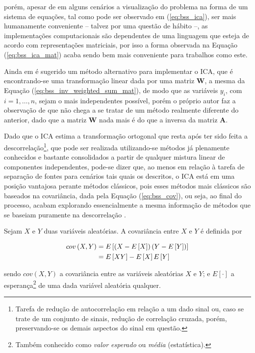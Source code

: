 \noindent porém, apesar de em alguns cenários a visualização do problema na forma de um sistema de equações, tal como pode ser observado em (\ref{eq:bss_ica}), ser mais humanamente conveniente -- talvez por uma questão de hábito --, as implementações computacionais são dependentes de uma linguagem que esteja de acordo com representações matriciais, por isso a forma observada na Equação (\ref{eq:bss_ica_mat}) acaba sendo bem mais conveniente para trabalhos como este.

Ainda em \citep{hyvarinen2004independent} é sugerido um método alternativo para implementar o ICA, que é encontrando-se uma transformação linear dada por uma matriz $\mathbf{W}$, a mesma da Equação (\ref{eq:bss_inv_weighted_sum_mat}), de modo que as variáveis $y_{i}$, com $i=1,\dotsc,n$, sejam o mais independentes possível, porém o próprio autor faz a observação de que não chega a se tratar de um método realmente diferente do anterior, dado que a matriz $\mathbf{W}$ nada mais é do que a inversa da matriz $\mathbf{A}$.

Dado que o ICA estima a transformação ortogonal que resta após ter sido feita a descorrelação\footnote{Tarefa de redução de autocorrelação em relação a um dado sinal ou, caso se trate de um conjunto de sinais, redução de correlação cruzada, porém, preservando-se os demais aspectos do sinal em questão.}, que pode ser realizada utilizando-se métodos já plenamente conhecidos e bastante consolidados a partir de qualquer mistura linear de componentes independentes, pode-se dizer que, ao menos em relação à tarefa de separação de fontes para cenários tais quais os descritos, o ICA está em uma posição vantajosa perante métodos clássicos, pois esses métodos mais clássicos são baseados na covariância, dada pela Equação (\ref{eq:bss_cov}), ou seja, ao final do processo, acabam explorando essencialmente a mesma informação de métodos que se baseiam puramente na descorrelação \citep{hyvarinen2004independent}.\\

\begin{definition}[Covariância]
    Sejam $X$ e $Y$ duas variáveis aleatórias. A covariância entre $X$ e $Y$ é definida por

    \begin{equation}
    \begin{aligned}
        cov\left(X, Y\right) & = E\left[\left(X-E\left[X\right]\right)\left(Y-E\left[Y\right]\right)\right] \\
         & = E\left[XY\right] - E\left[X\right] E\left[Y\right]
        \vspace{0.2cm}
        \label{eq:bss_cov}
    \end{aligned}
    \vspace{0.2cm}
    \end{equation}

    \noindent sendo $cov(X, Y)$ a covariância entre as variáveis aleatórias $X$ e $Y$; e $E[\cdot]$ a esperança\footnote{Também conhecido como \textit{valor esperado} ou \textit{média} (estatística).} de uma dada variável aleatória qualquer.
\end{definition}



